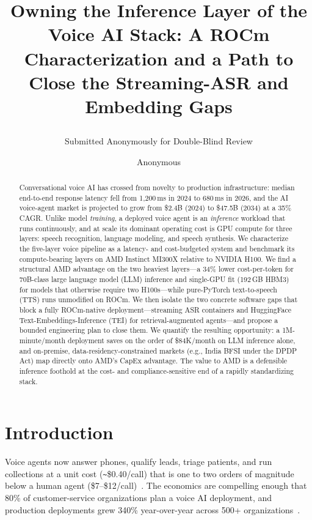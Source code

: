 \documentclass[blind]{gtac}
\title{Owning the Inference Layer of the Voice AI Stack: A ROCm Characterization and a Path to Close the Streaming-ASR and Embedding Gaps\subtitle{Submitted Anonymously for Double-Blind Review}}
\author{Anonymous}
\begin{document}
\maketitle

\pagestyle{fancy}
\fancyhf{}
\cfoot{\thepage}
\renewcommand{\headrulewidth}{0pt}
\thispagestyle{fancy}

\begin{abstract}
Conversational voice AI has crossed from novelty to production infrastructure: median end-to-end response latency fell from 1{,}200\,ms in 2024 to 680\,ms in 2026, and the AI voice-agent market is projected to grow from \$2.4B (2024) to \$47.5B (2034) at a 35\% CAGR. Unlike model \emph{training}, a deployed voice agent is an \emph{inference} workload that runs continuously, and at scale its dominant operating cost is GPU compute for three layers: speech recognition, language modeling, and speech synthesis. We characterize the five-layer voice pipeline as a latency- and cost-budgeted system and benchmark its compute-bearing layers on AMD Instinct MI300X relative to NVIDIA H100. We find a structural AMD advantage on the two heaviest layers---a 34\% lower cost-per-token for 70B-class large language model (LLM) inference and single-GPU fit (192\,GB HBM3) for models that otherwise require two H100s---while pure-PyTorch text-to-speech (TTS) runs unmodified on ROCm. We then isolate the two concrete software gaps that block a fully ROCm-native deployment---streaming ASR containers and HuggingFace Text-Embeddings-Inference (TEI) for retrieval-augmented agents---and propose a bounded engineering plan to close them. We quantify the resulting opportunity: a 1M-minute/month deployment saves on the order of \$84K/month on LLM inference alone, and on-premise, data-residency-constrained markets (e.g., India BFSI under the DPDP Act) map directly onto AMD's CapEx advantage. The value to AMD is a defensible inference foothold at the cost- and compliance-sensitive end of a rapidly standardizing stack.
\end{abstract}


\section{Introduction}
Voice agents now answer phones, qualify leads, triage patients, and run collections at a unit cost (\texttt{\textasciitilde}\$0.40/call) that is one to two orders of magnitude below a human agent (\$7--\$12/call)~\cite{assemblyai_2026,grandview}. The economics are compelling enough that 80\% of customer-service organizations plan a voice AI deployment, and production deployments grew 340\% year-over-year across 500+ organizations~\cite{assemblyai_2026}.
\end{document}
